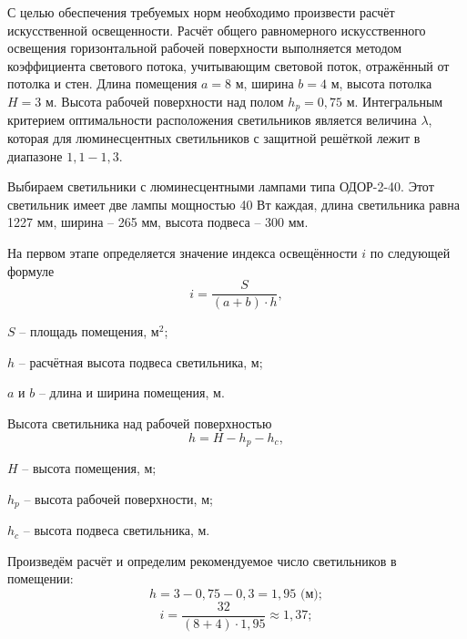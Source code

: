 С целью обеспечения требуемых норм необходимо произвести расчёт искусственной освещенности.
Расчёт общего равномерного искусственного освещения горизонтальной рабочей поверхности выполняется методом коэффициента светового потока, учитывающим световой поток, отражённый от потолка и стен. Длина помещения $a = 8$ м, ширина $b = 4$ м, высота потолка $H = 3$ м. Высота рабочей поверхности над полом $h_p = 0,75$ м. Интегральным критерием оптимальности расположения светильников является величина $\lambda$, которая для люминесцентных светильников с защитной решёткой лежит в диапазоне $1,1 - 1,3$.

Выбираем светильники с люминесцентными лампами типа ОДОР-2-40.
Этот светильник имеет две лампы мощностью 40 Вт каждая, длина светильника равна 1227 мм, ширина -- 265 мм, высота подвеса -- 300 мм.

На первом этапе определяется значение индекса освещённости $i$ по следующей формуле
\begin{equation}
    i = \frac{S}{(a + b) \cdot h},
\end{equation}
\begin{where}
    \item $S$ -- площадь помещения, $\text{м}^2$;
    \item $h$ -- расчётная высота подвеса светильника, м;
    \item $a$ и $b$ -- длина и ширина помещения, м.
\end{where}

Высота светильника над рабочей поверхностью
\begin{equation}
    h = H - h_p - h_c,
\end{equation}
\begin{where}
    \item $H$ -- высота помещения, м;
    \item $h_p$ -- высота рабочей поверхности, м;
    \item $h_c$ -- высота подвеса светильника, м.
\end{where}

Произведём расчёт и определим рекомендуемое число светильников в помещении:
$$h = 3 - 0,75 - 0,3 = 1,95 \text{ (м)};$$
$$i = \frac{32}{(8+4) \cdot 1,95} \approx 1,37;$$

